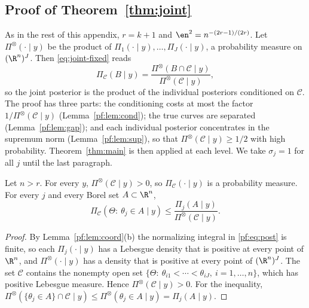 \subsection{Proof of Theorem~\ref{thm:joint}}\label{pf:sec:joint}

As in the rest of this appendix, $r=k+1$ and $\en^2=n^{-(2r-1)/(2r)}$. Let $\Pi^{\otimes}(\cdot\mid y)$ be the product of $\Pi_1(\cdot\mid y),\dots,\Pi_J(\cdot\mid y)$, a probability measure on $(\R^n)^J$. Then \eqref{eq:joint-fixed} reads
\[
\Pi_{\mathcal C}(B\mid y)=\frac{\Pi^{\otimes}(B\cap\mathcal C\mid y)}{\Pi^{\otimes}(\mathcal C\mid y)} ,
\]
so the joint posterior is the product of the individual posteriors conditioned on $\mathcal C$. The proof has three parts: the conditioning costs at most the factor $1/\Pi^{\otimes}(\mathcal C\mid y)$ (Lemma~\ref{pf:lem:cond}); the true curves are separated (Lemma~\ref{pf:lem:gap}); and each individual posterior concentrates in the supremum norm (Lemma~\ref{pf:lem:sup}), so that $\Pi^{\otimes}(\mathcal C\mid y)\ge1/2$ with high probability. Theorem~\ref{thm:main} is then applied at each level. We take $\sigma_j=1$ for all $j$ until the last paragraph.

\begin{lemma}[conditioning]\label{pf:lem:cond}
Let $n>r$. For every $y$, $\Pi^{\otimes}(\mathcal C\mid y)>0$, so $\Pi_{\mathcal C}(\cdot\mid y)$ is a probability measure. For every $j$ and every Borel set $A\subset\R^n$,
\[
\Pi_{\mathcal C}(\Theta:\ \theta_j\in A\mid y)\le\frac{\Pi_j(A\mid y)}{\Pi^{\otimes}(\mathcal C\mid y)} .
\]
\end{lemma}

\begin{proof}
By Lemma~\ref{pf:lem:coord}(b) the normalizing integral in \eqref{pf:eq:post} is finite, so each $\Pi_j(\cdot\mid y)$ has a Lebesgue density that is positive at every point of $\R^n$, and $\Pi^{\otimes}(\cdot\mid y)$ has a density that is positive at every point of $(\R^n)^J$. The set $\mathcal C$ contains the nonempty open set $\{\Theta:\ \theta_{i1}<\cdots<\theta_{iJ},\ i=1,\dots,n\}$, which has positive Lebesgue measure. Hence $\Pi^{\otimes}(\mathcal C\mid y)>0$. For the inequality, $\Pi^{\otimes}(\{\theta_j\in A\}\cap\mathcal C\mid y)\le\Pi^{\otimes}(\theta_j\in A\mid y)=\Pi_j(A\mid y)$.
\end{proof}

